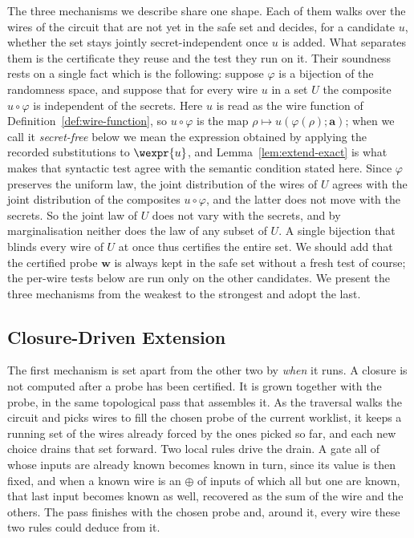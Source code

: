 The three mechanisms we describe share one shape. Each of them walks over the wires
of the circuit that are not yet in the safe set and decides, for a candidate $u$,
whether the set stays jointly secret-independent once $u$ is added. What separates
them is the certificate they reuse and the test they run on it. Their soundness
rests on a single fact which is the following: suppose $\varphi$
is a bijection of the randomness space, and suppose that for
every wire $u$ in a set $U$ the composite $u \circ \varphi$ is independent of the secrets.
Here $u$ is read as the wire function of Definition~\ref{def:wire-function}, so
$u \circ \varphi$ is the map $\rho \mapsto u(\varphi(\rho); \mathbf{a})$; when we
call it \emph{secret-free} below we mean the expression obtained by applying the
recorded substitutions to $\wexpr{u}$, and Lemma~\ref{lem:extend-exact} is what
makes that syntactic test agree with the semantic condition stated here.
Since $\varphi$ preserves the uniform law, the joint distribution of the wires of
$U$ agrees with the joint distribution of the composites $u \circ \varphi$, and the
latter does not move with the secrets.
So the joint law of $U$ does not vary with the secrets, and by marginalisation neither
does the law of any subset of $U$. A single bijection that blinds
every wire of $U$ at once thus certifies the entire set. We should add that the
certified probe $\mathbf{w}$ is always kept in the safe set without a fresh test of course;
the per-wire tests below are run only on the other candidates. We present the three
mechanisms from the weakest to the strongest and adopt the last.

  \subsection{Closure-Driven Extension}
  \label{sec:closures}

  The first mechanism is set apart from the other two by \emph{when} it runs. A
  closure is not computed after a probe has been certified. It is grown together
  with the probe, in the same topological pass that assembles it. As the traversal
  walks the circuit and picks wires to fill the chosen probe of the current
  worklist, it keeps a running set of the wires already forced by the ones picked
  so far, and each new choice drains that set forward. Two local rules drive the
  drain. A gate all of whose inputs are already known becomes known in turn, since
  its value is then fixed, and when a known wire is an $\oplus$ of inputs of which
  all but one are known, that last input becomes known as well, recovered as the
  sum of the wire and the others. The pass finishes with the chosen probe and,
  around it, every wire these two rules could deduce from it.


